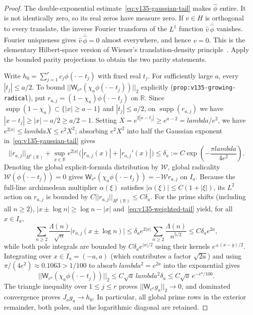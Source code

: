 \documentclass[11pt]{article}
\def\lambda{lambda}%
\def\norm#1{||#1||}%
\theoremstyle{remark}
\newcommand{\norm}[1]{\left\lVert #1\right\rVert}
\begin{document}
\begin{proof}
The double-exponential estimate~\eqref{eq:v135-gaussian-tail} makes $\widehat{\phi}$ entire. It is not identically zero, so its real zeros have measure zero. If $v \in H$ is orthogonal to every translate, the inverse Fourier transform of the $L^1$ function $\widehat{v}\,\overline{\widehat{\phi}}$ vanishes. Fourier uniqueness gives $\widehat{v}\,\overline{\widehat{\phi}} = 0$ almost everywhere, and hence $v = 0$. This is the elementary Hilbert-space version of Wiener's translation-density principle~\cite{Wiener1932}. Apply the bounded parity projections to obtain the two parity statements.

Write $h_0 = \sum_{j=1}^r c_j \phi(\cdot - t_j)$ with fixed real $t_j$. For sufficiently large $a$, every $|t_j| \le a/2$. To bound $\norm{\mathsf{W}_{e^a}(\chi_a\phi(\cdot - t_j))}_2$ explicitly (\texttt{prop:v135-growing-radical}), put $r_{a,j} = (1 - \chi_a)\phi(\cdot - t_j)$ on $\mathbb{R}$. Since $\operatorname{supp}(1-\chi_a) \subset \{|x| \ge a-1\}$ and $|t_j| \le a/2$, on $\operatorname{supp}(r_{a,j})$ we have $|x - t_j| \ge |x| - a/2 \ge a/2 - 1$. Setting $X = e^{2|x-t_j|} \ge e^{a-2} = \lambda/e^2$, we have $e^{2|x|} \le \lambda X \le e^2 X^2$; absorbing $e^2 X^2$ into half the Gaussian exponent in~\eqref{eq:v135-gaussian-tail} gives
\begin{equation}\label{eq:v135-weighted-tail}
  \norm{r_{a,j}}_{H^1(\mathbb{R})} + \sup_{x \in \mathbb{R}} e^{2|x|}\bigl(|r_{a,j}(x)| + |r_{a,j}'(x)|\bigr) \le \delta_a := C\exp\!\left(-\frac{\pi\lambda}{4e^2}\right).
\end{equation}
Denoting the global explicit-formula distribution by $\mathcal{W}$, global radicality $\mathcal{W}(\phi(\cdot - t_j)) = 0$ gives $\mathsf{W}_{e^a}(\chi_a\phi(\cdot - t_j)) = -\mathcal{W}r_{a,j}$ on $I_a$. Because the full-line archimedean multiplier $\alpha(\xi)$ satisfies $|\alpha(\xi)| \le C(1 + |\xi|)$, its $L^2$ action on $r_{a,j}$ is bounded by $C\norm{r_{a,j}}_{H^1(\mathbb{R})} \le C\delta_a$. For the prime shifts (including all $n \ge 2$), $|x \pm \log n| \ge \log n - |x|$ and~\eqref{eq:v135-weighted-tail} yield, for all $x \in I_a$,
\[
  \sum_{n \ge 2} \frac{\Lambda(n)}{\sqrt{n}}\bigl|r_{a,j}(x \pm \log n)\bigr| \le \delta_a e^{2|x|} \sum_{n \ge 2} \frac{\Lambda(n)}{n^{5/2}} \le C\delta_a e^{2a},
\]
while both pole integrals are bounded by $C\delta_a e^{|x|/2}$ using their kernels $e^{\pm(x-y)/2}$. Integrating over $x \in I_a = (-a,a)$ (which contributes a factor $\sqrt{2a}$) and using $\pi/(4e^2) \approx 0.1063 > 1/100$ to absorb $\lambda^2 = e^{2a}$ into the exponential gives
\begin{equation}\label{eq:single-translate-residual}
  \norm{\mathsf{W}_{e^a}(\chi_a\phi(\cdot - t_j))}_2 \le C\sqrt{a}\,\lambda^2\delta_a \le C\sqrt{a}\,e^{-e^a/100}.
\end{equation}
The triangle inequality over $1 \le j \le r$ proves $\norm{\mathsf{W}_{e^a}g_a}_2 \to 0$, and dominated convergence proves $J_a g_a \to h_0$. In particular, all global prime rows in the exterior remainder, both poles, and the logarithmic diagonal are retained.
\end{proof}
\end{document}
